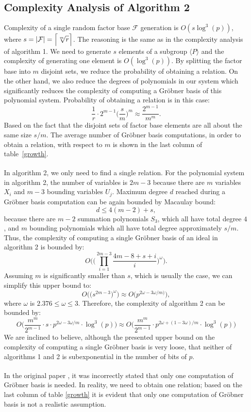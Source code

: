 \documentclass[thesis=M,english]{FITthesis}[2012/10/20]
\theoremstyle{remark}
\theoremstyle{definition}
\begin{document}
\subsection{Complexity Analysis of Algorithm 2}
Complexity of a single random factor base $\mathcal{F}$ generation is $O(s\log^3(p))$, where $s = |\mathcal{F}| = \mathlarger{\Big\lceil \sqrt[m]{r} \Big\rceil}$. The reasoning is the same as in the complexity analysis of algorithm 1. We need to generate $s$ elements of a subgroup $\langle P \rangle$ and the complexity of generating one element is $O(\log^3(p))$. By splitting the factor base into $m$ disjoint sets, we reduce the probability of obtaining a relation. On the other hand, we also reduce the degrees of polynomials in our system which significantly reduces the complexity of computing a Gröbner basis of this polynomial system. Probability of obtaining a relation is in this case:
$$
\frac{1}{r}\cdot2^{m-1} \bigg(\frac{s}{m}\bigg)^m \approx \frac{2^{m-1}}{m^m}.
$$
\noindent Based on the fact that the disjoint sets of factor base elements are all about the same size $s/m$. The average number of Gröbner basis computations, in order to obtain a relation, with respect to $m$ is shown in the last column of table~\ref{growth}. \\ \\
\noindent In algorithm 2, we only need to find a single relation.  For the polynomial system in algorithm 2, the number of variables is $2m-3$ because there are $m$ variables $X_i$ and $m-3$ bounding variables $U_j$. Maximum degree $d$ reached during a Gröbner basis computation can be again bounded by Macaulay bound:
$$
d \leq 4(m-2) + s,
$$
because there are $m - 2$ summation polynomials $S_3$, which all have total degree $4$, and $m$ bounding polynomials which all have total degree approximately $s/m$.  Thus, the complexity of computing a single Gröbner basis of an ideal in algorithm 2 is bounded by:
$$
O\Bigg(\bigg(\prod_{i=1}^{2m-3}\frac{4m - 8 + s + i}{i} \bigg)^\omega\Bigg).
$$
Assuming $m$ is significantly smaller than $s$, which is usually the case, we can simplify this upper bound to:
$$
O\Bigg(\bigg(s^{2m-3}\bigg)^\omega\Bigg) \approx O\Bigg( p^{2\omega - 3\omega/m)}\Bigg),
$$
where $\omega$ is $2.376 \leq \omega \leq 3.$
\noindent Therefore, the complexity of algorithm 2 can be bounded by:
$$
O\Bigg(\frac{m^m}{2^{m-1}}\cdot s \cdot p^{2\omega - 3\omega/m} \cdot \log^3(p)\Bigg) \approx O\Bigg(\frac{m^m}{2^{m-1}}\cdot p^{2\omega +(1- 3\omega)/m}\cdot \log^3(p)\Bigg)
$$
We are inclined to believe, although the presented upper bound on the complexity of computing a single Gröbner basis is very loose, that neither of algorithms 1 and 2 is subexponential in the number of bits of $p$. 
\\ \\
\noindent In the original paper \cite{amadori17}, it was incorrectly stated that only one computation of Gröbner basis is needed. In reality, we need to obtain one relation; based on the last column of table \ref{growth} it is evident that only one computation of Gröbner basis is not a realistic assumption. 
\end{document}
